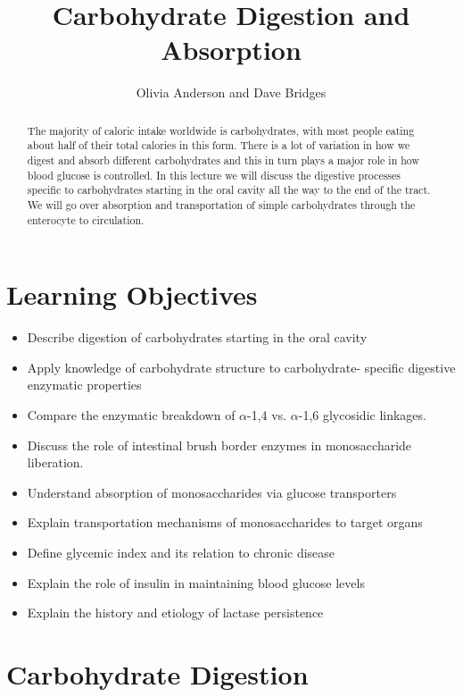 \documentclass{tufte-handout}
\title{Carbohydrate Digestion and Absorption}
\author{Olivia Anderson and Dave Bridges}
\begin{document}
\maketitle%

\begin{abstract}
The majority of caloric intake worldwide is carbohydrates, with most people eating about half of their total calories in this form.  There is a lot of variation in how we digest and absorb different carbohydrates and this in turn plays a major role in how blood glucose is controlled.  In this lecture we will discuss the digestive processes specific to carbohydrates starting in the oral cavity all the way to the end of the tract. We will go over absorption and transportation of simple carbohydrates through the enterocyte to circulation.
\end{abstract}

\tableofcontents


\pagebreak{}


\section{Learning Objectives}

\begin{itemize}
\item Describe digestion of carbohydrates starting in the oral cavity
\item Apply knowledge of carbohydrate structure to carbohydrate- specific digestive enzymatic properties
\item Compare the enzymatic breakdown of $\alpha$-1,4 vs. $\alpha$-1,6 glycosidic linkages.
\item Discuss the role of intestinal brush border enzymes in monosaccharide liberation.
\item Understand absorption of monosaccharides via glucose transporters
\item Explain transportation mechanisms of monosaccharides to target organs
\item Define glycemic index and its relation to chronic disease
\item Explain the role of insulin in maintaining blood glucose levels
\item Explain the history and etiology of lactase persistence
\end{itemize}


\section{Carbohydrate Digestion}\label{carbohydrate-digestion}
\end{document}
